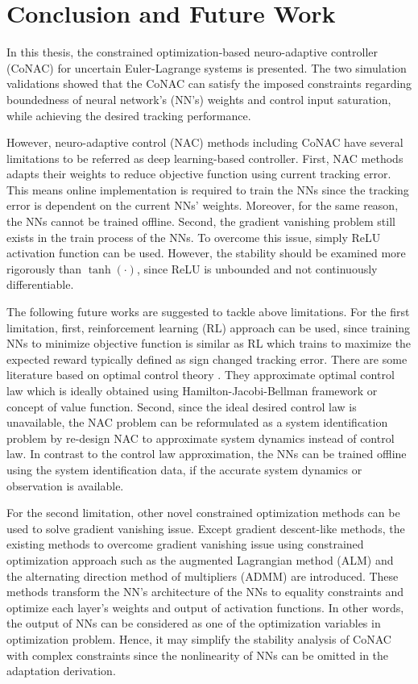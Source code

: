
\chapter{Conclusion and Future Work} \label{chapter5}

In this thesis, the constrained optimization-based neuro-adaptive controller (CoNAC) for uncertain Euler-Lagrange systems is presented. 
The two simulation validations showed that the CoNAC can satisfy the imposed constraints regarding boundedness of neural network's (NN's) weights and control input saturation, while achieving the desired tracking performance.

However, neuro-adaptive control (NAC) methods including CoNAC have several limitations to be referred as deep learning-based controller.
First, NAC methods adapts their weights to reduce objective function using current tracking error. 
This means online implementation is required to train the NNs since the tracking error is dependent on the current NNs' weights.
Moreover, for the same reason, the NNs cannot be trained offline.
Second, the gradient vanishing problem still exists in the train process of the NNs.
To overcome this issue, simply ReLU activation function can be used.
However, the stability should be examined more rigorously than $\tanh(\cdot)$, since ReLU is unbounded and not continuously differentiable.

The following future works are suggested to tackle above limitations.
For the first limitation, first, reinforcement learning (RL) approach can be used, since training NNs to minimize objective function is similar as RL which trains to maximize the expected reward typically defined as sign changed tracking error.
There are some literature based on optimal control theory \cite{RN119,RN120,RN121}.
They approximate optimal control law which is ideally obtained using Hamilton-Jacobi-Bellman framework or concept of value function.
Second, since the ideal desired control law is unavailable, the NAC problem can be reformulated as a system identification problem by re-design NAC to approximate system dynamics instead of control law.
In contrast to the control law approximation, the NNs can be trained offline using the system identification data, if the accurate system dynamics or observation is available.

For the second limitation, other novel constrained optimization methods can be used to solve gradient vanishing issue.
Except gradient descent-like methods, the existing methods to overcome gradient vanishing issue using constrained optimization approach such as the augmented Lagrangian method (ALM) \cite{RN62} and the alternating direction method of multipliers (ADMM) \cite{RN98, RN94} are introduced.
These methods transform the NN's architecture of the NNs to equality constraints and optimize each layer's weights and output of activation functions.
In other words, the output of NNs can be considered as one of the optimization variables in optimization problem.
Hence, it may simplify the stability analysis of CoNAC with complex constraints since the nonlinearity of NNs can be omitted in the adaptation derivation.

